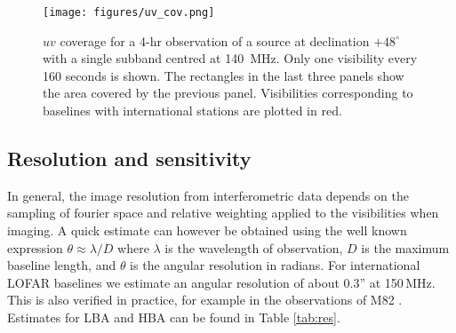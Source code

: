 \documentclass[graybox]{svmult}
\begin{document}
\begin{figure}[t]
\begin{center}
\texttt{[image: figures/uv\_cov.png]}
\caption{$uv$ coverage for a 4-hr observation of a source at declination
$+48^{\circ}$ with a single subband centred at 140~MHz. Only one visibility every 160 seconds is shown. The rectangles in the last three panels show the area covered by the previous panel. Visibilities corresponding to baselines with international
stations are plotted in red.}
\label{fig:uvcoverage}
\end{center}
\end{figure}

%

\subsection{Resolution and sensitivity}
In general, the image resolution from interferometric data depends on the
sampling of fourier space and relative weighting applied to the visibilities
when imaging.  A quick estimate can however be obtained using the well known
expression  $\theta \approx \lambda / D$
where $\lambda$ is the wavelength of observation, $D$ is the maximum baseline
length, and $\theta$ is the angular resolution in radians.  For international
LOFAR baselines we estimate an angular resolution of about 0.3'' at 150\,MHz.
This is also verified in practice, for example in the observations of M82
\cite{varenius15}. Estimates for LBA and HBA can be found in Table \ref{tab:res}.
\end{document}
